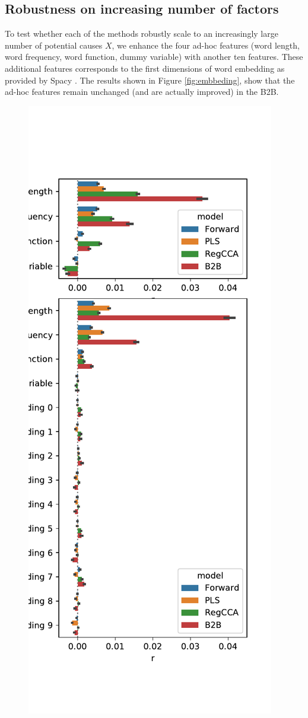 \subsection{Robustness on increasing number of factors}

To test whether each of the methods robustly scale to an increasingly large number of potential causes $X$, we enhance the four ad-hoc features (word length, word frequency, word function, dummy variable) with another ten features. These additional features corresponds to the first dimensions of word embedding as provided by Spacy \citep{spacy2}. The results shown in Figure \ref{fig:embbeding}, show that the ad-hoc features remain unchanged (and are actually improved) in the B2B.

\begin{figure}
  \centering
  \includegraphics[width=0.7\linewidth]{figures/compare_embeddings.pdf}

\end{figure}
